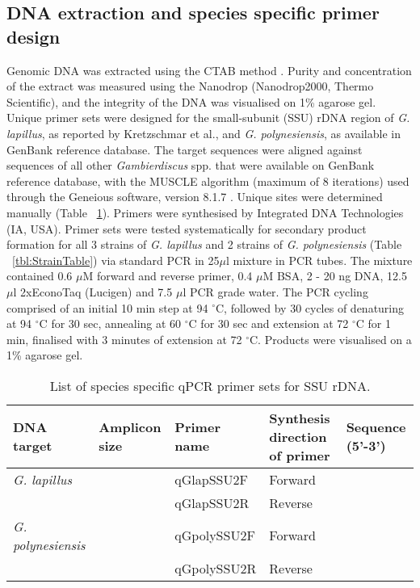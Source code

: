 \documentclass[12pt]{article}
\begin{document}
\subsection{DNA extraction and species specific primer design}
Genomic DNA was extracted using the CTAB method \citep{zhou1999analysis}. Purity and concentration of the extract was measured using the Nanodrop (Nanodrop2000, Thermo Scientific), and the integrity of the DNA was visualised on 1\% agarose gel.
Unique primer sets were designed for the small-subunit (SSU) rDNA region of \emph{G. lapillus}, as reported by Kretzschmar et al., and \emph{G. polynesiensis}, as available in GenBank reference database. The target sequences were aligned against sequences of all other \emph{Gambierdiscus} spp. that were available on GenBank reference database, with the MUSCLE algorithm (maximum of 8 iterations) \citep{edgar2004muscle} used through the Geneious software, version 8.1.7 \citep{kearse2012geneious}. Unique sites were determined manually (Table ~\ref{tbl:PrimerTable}). Primers were synthesised by Integrated DNA Technologies (IA, USA).
Primer sets were tested systematically for secondary product formation for all 3 strains of \emph{G. lapillus} and 2 strains of \emph{G. polynesiensis} (Table ~\ref{tbl:StrainTable}) via standard PCR in 25$\mu$l mixture in PCR tubes. The mixture contained 0.6 $\mu$M forward and reverse primer, 0.4 $\mu$M BSA, 2 - 20 ng DNA, 12.5 $\mu$l 2xEconoTaq (Lucigen) and 7.5 $\mu$l PCR grade water.
The PCR cycling comprised of an initial 10 min step at 94 $^{\circ}$C, followed by 30 cycles of denaturing at 94 $^{\circ}$C for 30 sec, annealing at 60 $^{\circ}$C for 30 sec and extension at 72 $^{\circ}$C for 1 min, finalised with 3 minutes of extension at 72 $^{\circ}$C. Products were visualised on a 1\% agarose gel.
\FloatBarrier
\begin{table}
\caption{List of species specific qPCR primer sets for SSU rDNA.}
\label{tbl:PrimerTable}
\begin{tabular}{ | p{2cm} | p{2cm} | p{2cm} | p{2cm} | p{7cm} | }
\hline
\textbf{DNA target} & \textbf{Amplicon size} & \textbf{Primer name} & \textbf{Synthesis direction of primer} & \textbf{Sequence (5'-3')} \\
\hline
\emph{G. lapillus} & &qGlapSSU2F & Forward & \\
\hline
& &qGlapSSU2R & Reverse & \\
\hline
\emph{G. polynesiensis}& &qGpolySSU2F& Forward & \\
\hline
& &qGpolySSU2R & Reverse & \\
\hline
\end{tabular}
\end{table}
\end{document}
